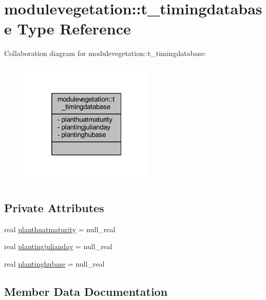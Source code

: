 \hypertarget{structmodulevegetation_1_1t__timingdatabase}{}\section{modulevegetation\+:\+:t\+\_\+timingdatabase Type Reference}
\label{structmodulevegetation_1_1t__timingdatabase}


Collaboration diagram for modulevegetation\+:\+:t\+\_\+timingdatabase\+:\nopagebreak
\begin{figure}[H]
\begin{center}
\leavevmode
\includegraphics[width=181pt]{structmodulevegetation_1_1t__timingdatabase__coll__graph}
\end{center}
\end{figure}
\subsection*{Private Attributes}
\begin{DoxyCompactItemize}
\item 
real \mbox{\hyperlink{structmodulevegetation_1_1t__timingdatabase_a4a0173e04c6937f32f12bacf9d9d4ab5}{planthuatmaturity}} = null\+\_\+real
\item 
real \mbox{\hyperlink{structmodulevegetation_1_1t__timingdatabase_a4e0f2b1ad6c23f9e45a7e50814e21173}{plantingjulianday}} = null\+\_\+real
\item 
real \mbox{\hyperlink{structmodulevegetation_1_1t__timingdatabase_a54e1d7869c6c518f9a47f3fce52a1f27}{plantinghubase}} = null\+\_\+real
\end{DoxyCompactItemize}


\subsection{Member Data Documentation}
\mbox{\label{structmodulevegetation_1_1t__timingdatabase_a4a0173e04c6937f32f12bacf9d9d4ab5}} 
